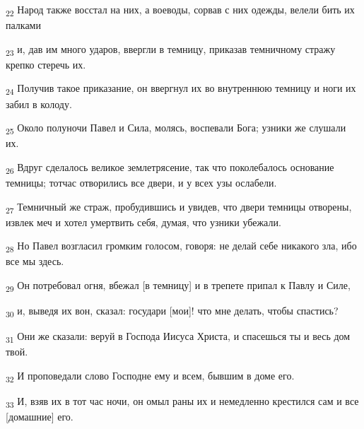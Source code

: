 \begin{tcolorbox}
\textsubscript{22} Народ также восстал на них, а воеводы, сорвав с них одежды, велели бить их палками
\end{tcolorbox}
\begin{tcolorbox}
\textsubscript{23} и, дав им много ударов, ввергли в темницу, приказав темничному стражу крепко стеречь их.
\end{tcolorbox}
\begin{tcolorbox}
\textsubscript{24} Получив такое приказание, он ввергнул их во внутреннюю темницу и ноги их забил в колоду.
\end{tcolorbox}
\begin{tcolorbox}
\textsubscript{25} Около полуночи Павел и Сила, молясь, воспевали Бога; узники же слушали их.
\end{tcolorbox}
\begin{tcolorbox}
\textsubscript{26} Вдруг сделалось великое землетрясение, так что поколебалось основание темницы; тотчас отворились все двери, и у всех узы ослабели.
\end{tcolorbox}
\begin{tcolorbox}
\textsubscript{27} Темничный же страж, пробудившись и увидев, что двери темницы отворены, извлек меч и хотел умертвить себя, думая, что узники убежали.
\end{tcolorbox}
\begin{tcolorbox}
\textsubscript{28} Но Павел возгласил громким голосом, говоря: не делай себе никакого зла, ибо все мы здесь.
\end{tcolorbox}
\begin{tcolorbox}
\textsubscript{29} Он потребовал огня, вбежал [в темницу] и в трепете припал к Павлу и Силе,
\end{tcolorbox}
\begin{tcolorbox}
\textsubscript{30} и, выведя их вон, сказал: государи [мои]! что мне делать, чтобы спастись?
\end{tcolorbox}
\begin{tcolorbox}
\textsubscript{31} Они же сказали: веруй в Господа Иисуса Христа, и спасешься ты и весь дом твой.
\end{tcolorbox}
\begin{tcolorbox}
\textsubscript{32} И проповедали слово Господне ему и всем, бывшим в доме его.
\end{tcolorbox}
\begin{tcolorbox}
\textsubscript{33} И, взяв их в тот час ночи, он омыл раны их и немедленно крестился сам и все [домашние] его.
\end{tcolorbox}
